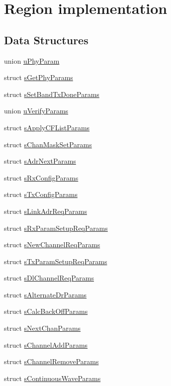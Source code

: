 \hypertarget{group__REGION}{}\section{Region implementation}
\label{group__REGION}
\subsection*{Data Structures}
\begin{DoxyCompactItemize}
\item 
union \hyperlink{unionuPhyParam}{u\+Phy\+Param}
\item 
struct \hyperlink{structsGetPhyParams}{s\+Get\+Phy\+Params}
\item 
struct \hyperlink{structsSetBandTxDoneParams}{s\+Set\+Band\+Tx\+Done\+Params}
\item 
union \hyperlink{unionuVerifyParams}{u\+Verify\+Params}
\item 
struct \hyperlink{structsApplyCFListParams}{s\+Apply\+C\+F\+List\+Params}
\item 
struct \hyperlink{structsChanMaskSetParams}{s\+Chan\+Mask\+Set\+Params}
\item 
struct \hyperlink{structsAdrNextParams}{s\+Adr\+Next\+Params}
\item 
struct \hyperlink{structsRxConfigParams}{s\+Rx\+Config\+Params}
\item 
struct \hyperlink{structsTxConfigParams}{s\+Tx\+Config\+Params}
\item 
struct \hyperlink{structsLinkAdrReqParams}{s\+Link\+Adr\+Req\+Params}
\item 
struct \hyperlink{structsRxParamSetupReqParams}{s\+Rx\+Param\+Setup\+Req\+Params}
\item 
struct \hyperlink{structsNewChannelReqParams}{s\+New\+Channel\+Req\+Params}
\item 
struct \hyperlink{structsTxParamSetupReqParams}{s\+Tx\+Param\+Setup\+Req\+Params}
\item 
struct \hyperlink{structsDlChannelReqParams}{s\+Dl\+Channel\+Req\+Params}
\item 
struct \hyperlink{structsAlternateDrParams}{s\+Alternate\+Dr\+Params}
\item 
struct \hyperlink{structsCalcBackOffParams}{s\+Calc\+Back\+Off\+Params}
\item 
struct \hyperlink{structsNextChanParams}{s\+Next\+Chan\+Params}
\item 
struct \hyperlink{structsChannelAddParams}{s\+Channel\+Add\+Params}
\item 
struct \hyperlink{structsChannelRemoveParams}{s\+Channel\+Remove\+Params}
\item 
struct \hyperlink{structsContinuousWaveParams}{s\+Continuous\+Wave\+Params}
\end{DoxyCompactItemize}

